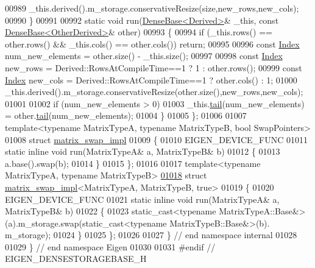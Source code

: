 \begin{DoxyCode}
00989     \_this.derived().m\_storage.conservativeResize(size,new\_rows,new\_cols);
00990   \}
00991 
00992   \textcolor{keyword}{static} \textcolor{keywordtype}{void} run(\hyperlink{group___core___module_class_eigen_1_1_dense_base}{DenseBase<Derived>}& \_this, \textcolor{keyword}{const} 
      \hyperlink{group___core___module_class_eigen_1_1_dense_base}{DenseBase<OtherDerived>}& other)
00993   \{
00994     \textcolor{keywordflow}{if} (\_this.rows() == other.rows() && \_this.cols() == other.cols()) \textcolor{keywordflow}{return};
00995 
00996     \textcolor{keyword}{const} \hyperlink{namespace_eigen_a62e77e0933482dafde8fe197d9a2cfde}{Index} num\_new\_elements = other.size() - \_this.size();
00997 
00998     \textcolor{keyword}{const} \hyperlink{namespace_eigen_a62e77e0933482dafde8fe197d9a2cfde}{Index} new\_rows = Derived::RowsAtCompileTime==1 ? 1 : other.rows();
00999     \textcolor{keyword}{const} \hyperlink{namespace_eigen_a62e77e0933482dafde8fe197d9a2cfde}{Index} new\_cols = Derived::RowsAtCompileTime==1 ? other.cols() : 1;
01000     \_this.derived().m\_storage.conservativeResize(other.size(),new\_rows,new\_cols);
01001 
01002     \textcolor{keywordflow}{if} (num\_new\_elements > 0)
01003       \_this.\hyperlink{group___core___module_aec3cf8f4f73c641d21a2c080c3e59662}{tail}(num\_new\_elements) = other.\hyperlink{group___core___module_aec3cf8f4f73c641d21a2c080c3e59662}{tail}(num\_new\_elements);
01004   \}
01005 \};
01006 
01007 \textcolor{keyword}{template}<\textcolor{keyword}{typename} MatrixTypeA, \textcolor{keyword}{typename} MatrixTypeB, \textcolor{keywordtype}{bool} SwapPo\textcolor{keywordtype}{int}ers>
01008 \textcolor{keyword}{struct }\hyperlink{struct_eigen_1_1internal_1_1matrix__swap__impl}{matrix\_swap\_impl}
01009 \{
01010   EIGEN\_DEVICE\_FUNC
01011   \textcolor{keyword}{static} \textcolor{keyword}{inline} \textcolor{keywordtype}{void} run(MatrixTypeA& a, MatrixTypeB& b)
01012   \{
01013     a.base().swap(b);
01014   \}
01015 \};
01016 
01017 \textcolor{keyword}{template}<\textcolor{keyword}{typename} MatrixTypeA, \textcolor{keyword}{typename} MatrixTypeB>
\hyperlink{struct_eigen_1_1internal_1_1matrix__swap__impl_3_01_matrix_type_a_00_01_matrix_type_b_00_01true_01_4}{01018} \textcolor{keyword}{struct }\hyperlink{struct_eigen_1_1internal_1_1matrix__swap__impl}{matrix\_swap\_impl}<MatrixTypeA, MatrixTypeB, true>
01019 \{
01020   EIGEN\_DEVICE\_FUNC
01021   \textcolor{keyword}{static} \textcolor{keyword}{inline} \textcolor{keywordtype}{void} run(MatrixTypeA& a, MatrixTypeB& b)
01022   \{
01023     \textcolor{keyword}{static\_cast<}typename MatrixTypeA::Base&\textcolor{keyword}{>}(a).m\_storage.swap(static\_cast<typename MatrixTypeB::Base&>(b).
      m\_storage);
01024   \}
01025 \};
01026 
01027 \} \textcolor{comment}{// end namespace internal}
01028 
01029 \} \textcolor{comment}{// end namespace Eigen}
01030 
01031 \textcolor{preprocessor}{#endif // EIGEN\_DENSESTORAGEBASE\_H}
\end{DoxyCode}
